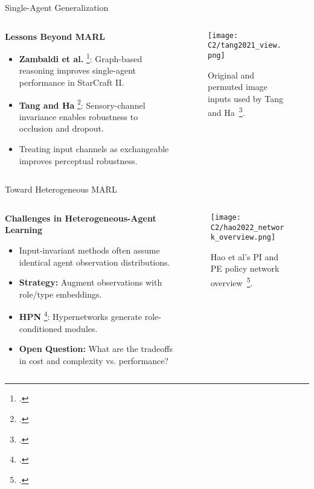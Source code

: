\begin{frame}{Single-Agent Generalization}
    \begin{columns}
        \begin{column}{0.6\textwidth}
            \textbf{Lessons Beyond MARL}
            \begin{itemize}
                \item \textbf{Zambaldi et al.} \footcite{zambaldi2018}: 
                    Graph-based reasoning improves single-agent performance in StarCraft II.
                \item \textbf{Tang and Ha} \footcite{tang2021}: 
                    Sensory-channel invariance enables robustness to occlusion and dropout.
                \item Treating input channels as exchangeable improves perceptual robustness.
            \end{itemize}
        \end{column}
        \begin{column}{0.4\textwidth}
            \begin{figure}
                \texttt{[image: C2/tang2021\_view.png]}
                \caption{Original and permuted image inputs used by Tang and Ha~\footcite{tang2021}.}
            \end{figure}
        \end{column}
    \end{columns}
\end{frame}

\begin{frame}{Toward Heterogeneous MARL}
    \begin{columns}
        \begin{column}{0.6\textwidth}
            \textbf{Challenges in Heterogeneous-Agent Learning}
            \begin{itemize}
                \item Input-invariant methods often assume identical agent observation distributions.
                \item \textbf{Strategy:} Augment observations with role/type embeddings.
                \item \textbf{HPN} \footcite{hao2023}: Hypernetworks generate role-conditioned modules.
                \item \textbf{Open Question:} What are the tradeoffs in cost and complexity vs. performance?
            \end{itemize}
        \end{column}
        \begin{column}{0.4\textwidth}
            \begin{figure}
                \texttt{[image: C2/hao2022\_network\_overview.png]}
                \caption{Hao et al's PI and PE policy network overview~\footcite{hao2023}.}
            \end{figure}
        \end{column}
    \end{columns}
\end{frame}

